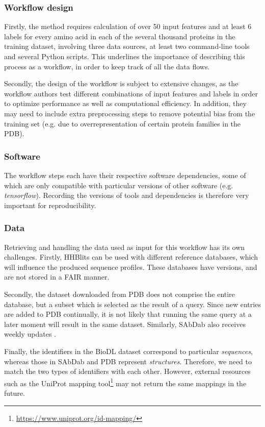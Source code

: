 \subsubsection{Workflow design}

Firstly, the method requires calculation of over 50 input features and at least 6 labels for every amino acid in each of the several thousand proteins in the training dataset, involving three data sources, at least two command-line tools and several Python scripts. This underlines the importance of describing this process as a workflow, in order to keep track of all the data flows. 

Secondly, the design of the workflow is subject to extensive changes, as the workflow authors test different combinations of input features and labels in order to optimize performance as well as computational efficiency. In addition, they may need to include extra preprocessing steps to remove potential bias from the training set (e.g. due to overrepresentation of certain protein families in the PDB).

\subsubsection{Software}

The workflow steps each have their respective software dependencies, some of which are only compatible with particular versions of other software (e.g. \emph{tensorflow}). Recording the versions of tools and dependencies is therefore very important for reproducibility.

\subsubsection{Data}
Retrieving and handling the data used as input for this workflow has its own challenges. 
Firstly, HHBlits can be used with different reference databases, which will influence the produced sequence profiles. These databases have versions, and are not stored in a FAIR manner. 

Secondly, the dataset downloaded from PDB does not comprise the entire database, but a subset which is selected as the result of a query. Since new entries are added to PDB continually, it is not likely that running the same query at a later moment will result in the same dataset. Similarly, SAbDab also receives weekly updates \cite{dunbarSAbDabStructuralAntibody2014}. 

Finally, the identifiers in the BioDL dataset correspond to particular \emph{sequences}, whereas those in SAbDab and PDB represent \emph{structures}. Therefore, we need to match the two types of identifiers with each other. However, external resources such as the UniProt mapping tool\footnote{\url{https://www.uniprot.org/id-mapping/}} \cite{theuniprotconsortiumUniProtUniversalProtein2021} may not return the same mappings in the future.

